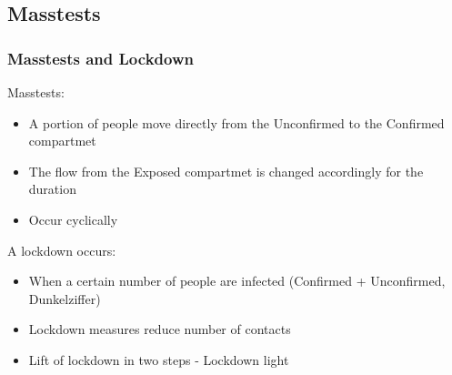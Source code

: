 \documentclass{beamer}
\begin{document}

\subsection{Masstests}
\begin{frame}
\frametitle{Masstests and Lockdown}
Masstests:

\begin{itemize}
  \item A portion of people move directly from the Unconfirmed to the Confirmed compartmet
  \item The flow from the Exposed compartmet is changed accordingly for the duration
  \item Occur cyclically
\end{itemize}

A lockdown occurs:
\begin{itemize}
  \item When a certain number of people are infected (Confirmed + Unconfirmed, \glqq Dunkelziffer\grqq)
  \item Lockdown measures reduce number of contacts
  \item Lift of lockdown in two steps - \glqq Lockdown light\grqq
\end{itemize}
\end{frame}





%

\end{document}
